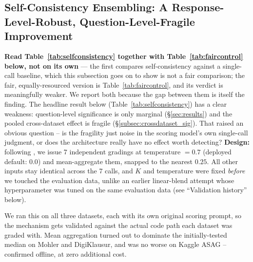 \documentclass[conference]{IEEEtran}
\begin{document}
\subsection{Self-Consistency Ensembling: A Response-Level-Robust, Question-Level-Fragile Improvement}
\label{subsec:selfconsistency}

\textbf{Read Table~\ref{tab:selfconsistency} together with
Table~\ref{tab:faircontrol} below, not on its own} --- the first
compares self-consistency against a single-call baseline, which this
subsection goes on to show is not a fair comparison; the fair,
equally-resourced version is Table~\ref{tab:faircontrol}, and its
verdict is meaningfully weaker. We report both because the gap
between them is itself the finding. The headline result below
(Table~\ref{tab:selfconsistency}) has a clear weakness: question-level
significance is only marginal (\S\ref{sec:results}) and the pooled
cross-dataset effect is fragile (\S\ref{subsec:crossdataset_sig}). That
raised an obvious question --
is the fragility just noise in the scoring model's own single-call
judgment, or does the architecture really have no effect worth
detecting? \textbf{Design:} following \cite{wang2023selfconsistency},
we issue 7 independent gradings at temperature $=0.7$ (deployed
default: $0.0$) and mean-aggregate them, snapped to the nearest
$0.25$. All other inputs stay identical across the 7 calls, and $K$
and temperature were fixed \emph{before} we touched the evaluation
data, unlike an earlier linear-blend attempt whose hyperparameter was
tuned on the same evaluation data (see ``Validation history'' below).

We ran this on all three datasets, each with its own original scoring
prompt, so the mechanism gets validated against the actual code path
each dataset was graded with. Mean aggregation turned out to dominate
the initially-tested median on Mohler and DigiKlausur, and was no
worse on Kaggle ASAG -- confirmed offline, at zero additional cost.
\end{document}
